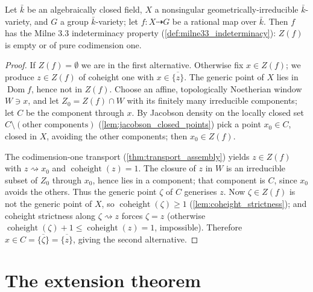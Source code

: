 \begin{theorem}
  \label{thm:milne33_keystone}
  \leanok
  Let \(\bar k\) be an algebraically closed field, \(X\) a nonsingular
  geometrically-irreducible \(\bar k\)-variety, and \(G\) a group
  \(\bar k\)-variety; let \(f : X \dashrightarrow G\) be a rational map over
  \(\bar k\). Then \(f\) has the Milne 3.3 indeterminacy property
  (\ref{def:milne33_indeterminacy}): \(Z(f)\) is empty or of pure codimension
  one.
\end{theorem}
\begin{proof}
  \leanok
  If \(Z(f) = \emptyset\) we are in the first alternative. Otherwise fix \(x \in
  Z(f)\); we produce \(z \in Z(f)\) of coheight one with \(x \in
  \overline{\{z\}}\). The generic point of \(X\) lies in \(\operatorname{Dom} f\),
  hence not in \(Z(f)\). Choose an affine, topologically Noetherian window
  \(W \ni x\), and let \(Z_0 = Z(f) \cap W\) with its finitely many irreducible
  components; let \(C\) be the component through \(x\). By Jacobson density on the
  locally closed set \(C \setminus (\text{other components})\)
  (\ref{lem:jacobson_closed_points}) pick a point \(x_0 \in C\), closed in \(X\),
  avoiding the other components; then \(x_0 \in Z(f)\).

  The codimension-one transport (\ref{thm:transport_assembly}) yields \(z \in
  Z(f)\) with \(z \rightsquigarrow x_0\) and \(\operatorname{coheight}(z) = 1\).
  The closure of \(z\) in \(W\) is an irreducible subset of \(Z_0\) through
  \(x_0\), hence lies in a component; that component is \(C\), since \(x_0\)
  avoids the others. Thus the generic point \(\zeta\) of \(C\) generises \(z\).
  Now \(\zeta \in Z(f)\) is not the generic point of \(X\), so
  \(\operatorname{coheight}(\zeta) \ge 1\) (\ref{lem:coheight_strictness});
  and coheight strictness along \(\zeta \rightsquigarrow z\) forces \(\zeta = z\)
  (otherwise \(\operatorname{coheight}(\zeta) + 1 \le \operatorname{coheight}(z) =
  1\), impossible). Therefore \(x \in C = \overline{\{\zeta\}} =
  \overline{\{z\}}\), giving the second alternative.
\end{proof}

\section{The extension theorem}
\label{sec:extension}

